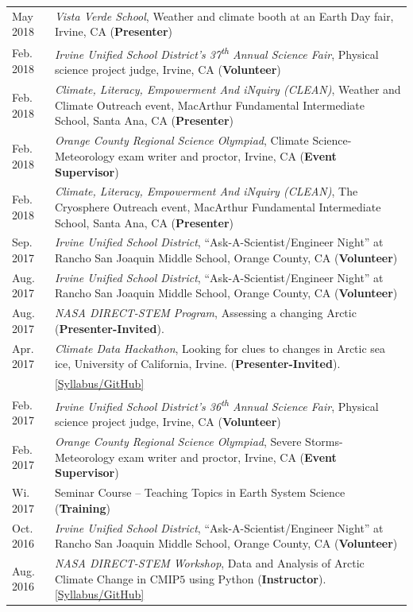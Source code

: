 \documentclass[margin,line,palatino,courier,10pt]{res}
\begin{document}
\begin{resume}
\begin{tabular}{@{}p{0.9in}p{4in}}
May 2018 & \textit{Vista Verde School}, Weather and climate booth at an Earth Day fair, Irvine, CA (\textbf{Presenter})\\
Feb. 2018 & \textit{Irvine Unified School District's 37\textsuperscript{th} Annual Science Fair}, Physical science project judge, Irvine, CA (\textbf{Volunteer})\\
Feb. 2018 & \textit{Climate, Literacy, Empowerment And iNquiry (CLEAN)}, Weather and Climate Outreach event, MacArthur Fundamental Intermediate School, Santa Ana, CA (\textbf{Presenter})\\
Feb. 2018 & \textit{Orange County Regional Science Olympiad}, Climate Science-Meteorology exam writer and proctor, Irvine, CA (\textbf{Event Supervisor})\\
Feb. 2018 & \textit{Climate, Literacy, Empowerment And iNquiry (CLEAN)}, The Cryosphere Outreach event, MacArthur Fundamental Intermediate School, Santa Ana, CA (\textbf{Presenter})\\
Sep. 2017 & \textit{Irvine Unified School District}, ``Ask-A-Scientist/Engineer Night'' at Rancho San Joaquin Middle School, Orange County, CA (\textbf{Volunteer})\\
Aug. 2017 & \textit{Irvine Unified School District}, ``Ask-A-Scientist/Engineer Night'' at Rancho San Joaquin Middle School, Orange County, CA (\textbf{Volunteer})\\
Aug. 2017 & \textit{NASA DIRECT-STEM Program}, Assessing a changing Arctic (\textbf{Presenter-Invited}).\\
Apr. 2017 & \textit{Climate Data Hackathon}, Looking for clues to changes in Arctic 
sea ice, University of California, Irvine. (\textbf{Presenter-Invited}).\\ & \href{https://github.com/UCIDataScienceInitiative/Climate_Hackathon}{[Syllabus/GitHub]}\\
Feb. 2017 & \textit{Irvine Unified School District's 36\textsuperscript{th} Annual Science Fair}, Physical science project judge, Irvine, CA (\textbf{Volunteer})\\
Feb. 2017 & \textit{Orange County Regional Science Olympiad}, Severe Storms-Meteorology exam writer and proctor, Irvine, CA (\textbf{Event Supervisor})\\
Wi. 2017 & Seminar Course -- Teaching Topics in Earth System Science (\textbf{Training})\\
Oct. 2016 & \textit{Irvine Unified School District}, ``Ask-A-Scientist/Engineer Night'' at Rancho San Joaquin Middle School, Orange County, CA (\textbf{Volunteer})\\
Aug. 2016 & \textit{NASA DIRECT-STEM Workshop}, Data and Analysis of Arctic Climate Change in CMIP$5$ using Python (\textbf{Instructor}). \href{https://github.com/strongh/DIRECT-STEM-climate-workshop}{[Syllabus/GitHub]}\\
\end{tabular}


\end{resume}
\end{document}
